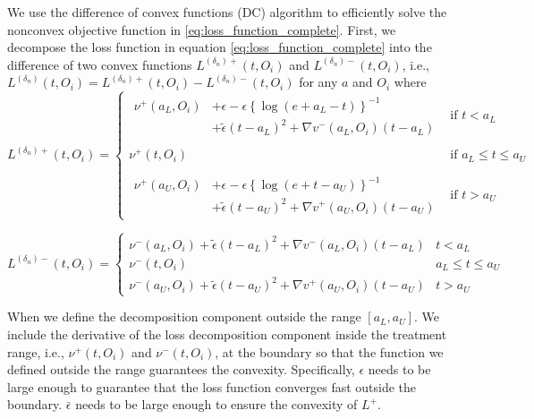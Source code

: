 \documentclass[12pt]{article}
\begin{document}
 
We use the difference of convex functions (DC) algorithm \citep{DCalgorithm} to efficiently solve the nonconvex objective function in \eqref{eq:loss_function_complete}. First, we decompose the loss function in equation \eqref{eq:loss_function_complete} into the difference of two convex functions $L^{({\delta_n})+}(t,O_i)$ and $L^{({\delta_n})-}(t,O_i)$, i.e., $L^{({\delta_n})}(t,O_i) = L^{({\delta_n})+}(t,O_i) - L^{({\delta_n})-}(t,O_i)$ for any $a$
 and $O_i$ where
$$ L^{({\delta_n})+}(t,O_i) =
\begin{cases}
    \begin{aligned}
        \nu^{+}(a_L, O_i) &+ \epsilon -\epsilon \left\{\log( e + a_L- t)\right\}^{-1} \\
                         & + \tilde{\epsilon} (t-a_L)^2 + \nabla v^{-}(a_L,O_i)(t-a_L)
    \end{aligned}
    & \text{if } t < a_L \\
    \\
    \nu^{+}(t, O_i)
    & \text{if } a_L\leq t\leq a_U \\
    \\
    \begin{aligned}
        \nu^{+}(a_U, O_i) &+ \epsilon -\epsilon \left\{\log( e + t- a_U)\right\}^{-1} \\
                         & + \tilde{\epsilon} (t-a_U)^2 + \nabla v^{+}(a_U,O_i)(t-a_U)
    \end{aligned}
    & \text{if } t > a_U
\end{cases}
$$

$$ L^{({\delta_n})-}(t,O_i) = 
\begin{cases}
    \nu^{-}(a_L, O_i)+\tilde{\epsilon} (t-a_L)^2 + \nabla v^{-}(a_L,O_i)(t-a_L)& t<a_L\\
    \nu^{-}(t, O_i)& a_L\leq t\leq a_U\\
    \nu^{-}(a_U, O_i)+\tilde{\epsilon} (t-a_U)^2 + \nabla v^{+}(a_U,O_i)(t-a_U)& t> a_U
\end{cases}
$$


 When we define the decomposition component outside the range $[a_L, a_U]$. We include the derivative of the loss decomposition component inside the treatment range, i.e., $\nu^{+}(t, O_i)$ and $\nu^{-}(t, O_i)$, at the boundary so that the function we defined outside the range guarantees the convexity. Specifically, $\epsilon$ needs to be large enough to guarantee that the loss function converges fast outside the boundary. $\bar\epsilon$ needs to be large enough to ensure the convexity of $L^{+}$.
\end{document}
